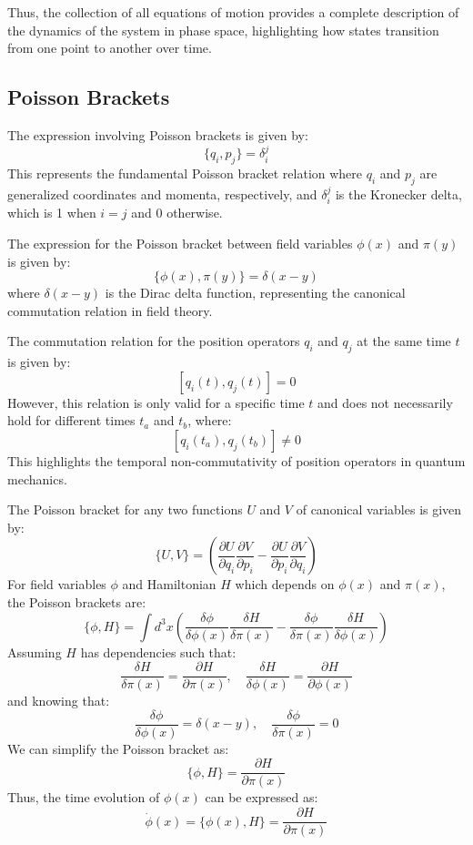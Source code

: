 \documentclass{article}
\begin{document}
Thus, the collection of all equations of motion provides a complete description of the dynamics of the system in phase space, highlighting how states transition from one point to another over time.

\subsection*{Poisson Brackets}
The expression involving Poisson brackets is given by:
\[
\{ q_i, p_j \} = \delta^j_i
\]
This represents the fundamental Poisson bracket relation where \( q_i \) and \( p_j \) are generalized coordinates and momenta, respectively, and \( \delta^j_i \) is the Kronecker delta, which is 1 when \( i = j \) and 0 otherwise.

The expression for the Poisson bracket between field variables \(\phi(x)\) and \(\pi(y)\) is given by:
\[
\{ \phi(x), \pi(y) \} = \delta(x - y)
\]
where \(\delta(x - y)\) is the Dirac delta function, representing the canonical commutation relation in field theory.

The commutation relation for the position operators \( q_i \) and \( q_j \) at the same time \( t \) is given by:
\[
[q_i(t), q_j(t)] = 0
\]
However, this relation is only valid for a specific time \( t \) and does not necessarily hold for different times \( t_a \) and \( t_b \), where:
\[
[q_i(t_a), q_j(t_b)] \neq 0
\]
This highlights the temporal non-commutativity of position operators in quantum mechanics.

The Poisson bracket for any two functions \(U\) and \(V\) of canonical variables is given by:
\[
\{U, V\} = \left(\frac{\partial U}{\partial q_i}\frac{\partial V}{\partial p_i} - \frac{\partial U}{\partial p_i}\frac{\partial V}{\partial q_i}\right)
\]
For field variables \(\phi\) and Hamiltonian \(H\) which depends on \(\phi(x)\) and \(\pi(x)\), the Poisson brackets are:
\[
\{\phi, H\} = \int d^3x \left( \frac{\delta \phi}{\delta \phi(x)} \frac{\delta H}{\delta \pi(x)} - \frac{\delta \phi}{\delta \pi(x)} \frac{\delta H}{\delta \phi(x)} \right)
\]
Assuming \(H\) has dependencies such that:
\[
\frac{\delta H}{\delta \pi(x)} = \frac{\partial H}{\partial \pi(x)}, \quad \frac{\delta H}{\delta \phi(x)} = \frac{\partial H}{\partial \phi(x)}
\]
and knowing that:
\[
\frac{\delta \phi}{\delta \phi(x)} = \delta(x-y), \quad \frac{\delta \phi}{\delta \pi(x)} = 0
\]
We can simplify the Poisson bracket as:
\[
\{\phi, H\} = \frac{\partial H}{\partial \pi(x)}
\]
Thus, the time evolution of \(\phi(x)\) can be expressed as:
\[
\dot{\phi}(x) = \{\phi(x), H\} = \frac{\partial H}{\partial \pi(x)}
\]
\end{document}
